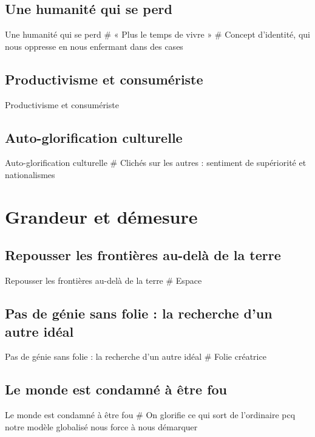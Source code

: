 \documentclass{beamer}
\begin{document}
\subsection{Une humanité qui se perd}
\begin{frame}{Une humanité qui se perd}
  # « Plus le temps de vivre »
  # Concept d'identité, qui nous oppresse en nous enfermant dans des cases
\end{frame}

\subsection{Productivisme et consumériste}
\begin{frame}{Productivisme et consumériste}

\end{frame}

\subsection{Auto-glorification culturelle}
\begin{frame}{Auto-glorification culturelle}
  # Clichés sur les autres : sentiment de supériorité et nationalismes
\end{frame}


\section{Grandeur et démesure}

\subsection{Repousser les frontières au-delà de la terre}
\begin{frame}{Repousser les frontières au-delà de la terre}
  # Espace
\end{frame}

\subsection{Pas de génie sans folie : la recherche d'un autre idéal}
\begin{frame}{Pas de génie sans folie : la recherche d'un autre idéal}
  # Folie créatrice
\end{frame}

\subsection{Le monde est condamné à être fou}
\begin{frame}{Le monde est condamné à être fou}
  # On glorifie ce qui sort de l'ordinaire pcq notre modèle globalisé nous force à nous démarquer
\end{frame}
\end{document}
